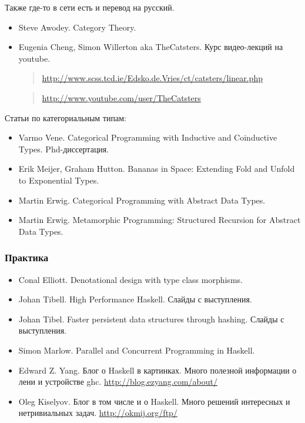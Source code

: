 Также где-то в сети есть и перевод на русский.

\begin{itemize}
\item
  Steve Awodey. Category Theory.
\item
  Eugenia Cheng, Simon Willerton aka TheCatsters. Курс видео-лекций на
  youtube.

  \begin{quote}
  \url{http://www.scss.tcd.ie/Edsko.de.Vries/ct/catsters/linear.php}
  \end{quote}

  \begin{quote}
  \url{http://www.youtube.com/user/TheCatsters}
  \end{quote}
\end{itemize}

Статьи по категориальным типам:

\begin{itemize}
\item
  Varmo Vene. Categorical Programming with Inductive and Coinductive
  Types. Phd-диссертация.
\item
  Erik Meijer, Graham Hutton. Bananas in Space: Extending Fold and
  Unfold to Exponential Types.
\item
  Martin Erwig. Categorical Programming with Abstract Data Types.
\item
  Martin Erwig. Metamorphic Programming: Structured Recursion for
  Abstract Data Types.
\end{itemize}

\subsubsection{Практика}

\begin{itemize}
\item
  Conal Elliott. Denotational design with type class morphisms.
\item
  Johan Tibell. High Performance Haskell. Слайды с выступления.
\item
  Johan Tibel. Faster persistent data structures through hashing. Слайды
  с выступления.
\item
  Simon Marlow. Parallel and Concurrent Programming in Haskell.
\item
  Edward Z. Yang. Блог о Haskell в картинках. Много полезной информации
  о лени и устройстве ghc. \url{http://blog.ezyang.com/about/}
\item
  Oleg Kiselyov. Блог в том числе и о Haskell. Много решений интересных
  и нетривиальных задач. \url{http://okmij.org/ftp/}
\end{itemize}

